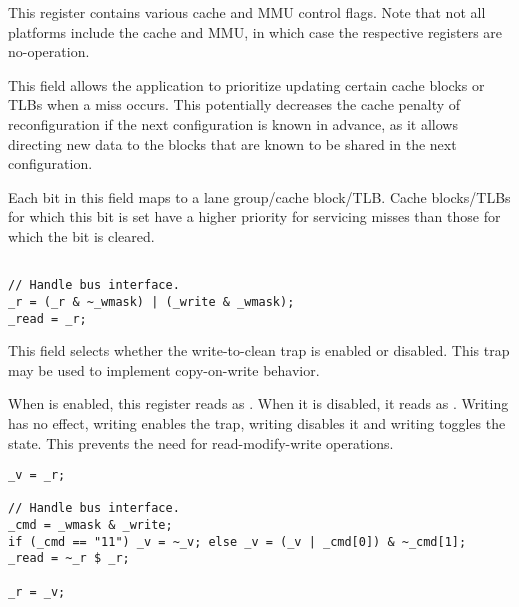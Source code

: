 

This register contains various cache and MMU control flags. Note that not all
platforms include the cache and MMU, in which case the respective registers are
no-operation.

This field allows the application to prioritize updating certain cache blocks or 
TLBs when a miss occurs. This potentially decreases the cache penalty of 
reconfiguration if the next configuration is known in advance, as it allows 
directing new data to the blocks that are known to be shared in the next 
configuration.

Each bit in this field maps to a lane group/cache block/TLB. Cache blocks/TLBs
for which this bit is set have a higher priority for servicing misses than
those for which the bit is cleared.

\declaration{}
\implementation{}
\begin{lstlisting}

// Handle bus interface.
_r = (_r & ~_wmask) | (_write & _wmask);
_read = _r;

\end{lstlisting}

This field selects whether the write-to-clean trap is enabled or disabled. This
trap may be used to implement copy-on-write behavior.

When  is enabled, this register reads as . 
When it is disabled, it reads as . Writing  has no effect, 
writing  enables the trap, writing  disables it and writing 
 toggles the state. This prevents the need for read-modify-write 
operations.

\declaration{}
\implementation{}
\begin{lstlisting}
_v = _r;

// Handle bus interface.
_cmd = _wmask & _write;
if (_cmd == "11") _v = ~_v; else _v = (_v | _cmd[0]) & ~_cmd[1];
_read = ~_r $ _r;

_r = _v;
\end{lstlisting}


